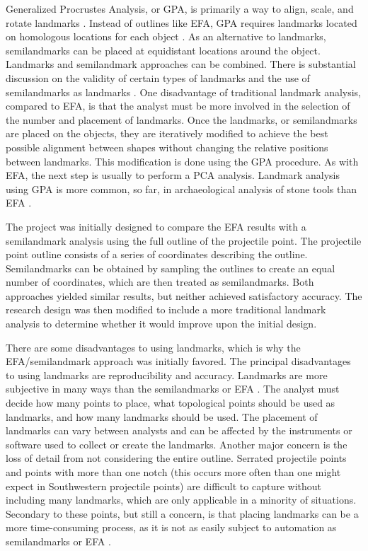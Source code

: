 \documentclass[letterpaper]{article}
\begin{document}
Generalized Procrustes Analysis, or GPA, is primarily a way to align, scale, and rotate landmarks \autocite{Gower1975-uv}. Instead of outlines like EFA, GPA requires landmarks located on homologous locations for each object \autocite{Rohlf1990-mp}. As an alternative to landmarks, semilandmarks can be placed at equidistant locations around the object. Landmarks and semilandmark approaches can be combined. There is substantial discussion on the validity of certain types of landmarks and the use of semilandmarks as landmarks \autocites[e.g.,][]{De_Groote2011-mh,MacLeod2017-yl,Okumura2019-ur,Shott2010-fn}. One disadvantage of traditional landmark analysis, compared to EFA, is that the analyst must be more involved in the selection of the number and placement of landmarks. Once the landmarks, or semilandmarks are placed on the objects, they are iteratively modified to achieve the best possible alignment between shapes without changing the relative positions between landmarks. This modification is done using the GPA procedure. As with EFA, the next step is usually to perform a PCA analysis. Landmark analysis using GPA is more common, so far, in archaeological analysis of stone tools than EFA \autocites[e.g.,][]{Archer2018-zi,Bischoff2020-zn,Buchanan2015-dx,Charlin2018-yg,Fisher2018-jq,Gingerich2014-cb,Herzlinger2017-ce,Lycett2010-od,Riede2019-gb,Selden2020-ni,Shott2010-fn,Smith2015-qk,Thulman2012-fo}.

The project was initially designed to compare the EFA results with a semilandmark analysis using the full outline of the projectile point. The projectile point outline consists of a series of coordinates describing the outline. Semilandmarks can be obtained by sampling the outlines to create an equal number of coordinates, which are then treated as semilandmarks. Both approaches yielded similar results, but neither achieved satisfactory accuracy. The research design was then modified to include a more traditional landmark analysis to determine whether it would improve upon the initial design.

There are some disadvantages to using landmarks, which is why the EFA/semilandmark approach was initially favored. The principal disadvantages to using landmarks are reproducibility and accuracy. Landmarks are more subjective in many ways than the semilandmarks or EFA \autocite[see][205]{Shott2010-fn}. The analyst must decide how many points to place, what topological points should be used as landmarks, and how many landmarks should be used. The placement of landmarks can vary between analysts and can be affected by the instruments or software used to collect or create the landmarks. Another major concern is the loss of detail from not considering the entire outline. Serrated projectile points and points with more than one notch (this occurs more often than one might expect in Southwestern projectile points) are difficult to capture without including many landmarks, which are only applicable in a minority of situations. Secondary to these points, but still a concern, is that placing landmarks can be a more time-consuming process, as it is not as easily subject to automation as semilandmarks or EFA \autocite[although see][ for one of several examples of automation]{Palaniswamy2010-sl}.
\end{document}
